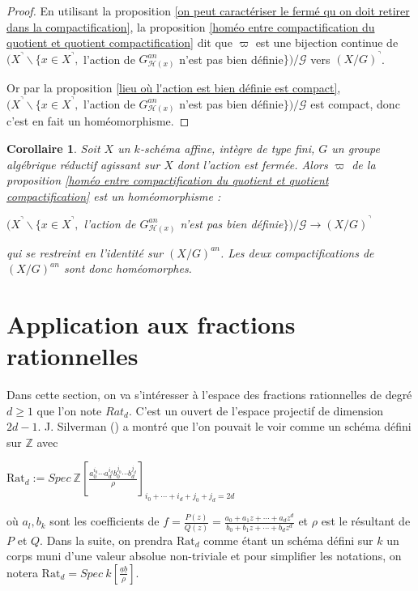 \documentclass[11pt]{article}
\newcommand{\Z}{\mathbb{Z}}
\newcommand{\Rat}{\mathrm{Rat}}
\newtheorem{cor}[thm]{Corollaire}
\begin{document}
\begin{proof}
En utilisant la proposition \ref{on peut caractériser le fermé qu on doit retirer dans la compactification}, la proposition \ref{homéo entre compactification du quotient et quotient compactification} dit que $\varpi$ est une bijection continue de $(X^\urcorner \backslash \lbrace x\in X^\urcorner,$ l'action de $G^{an}_{\mathcal{H}(x)}$ n'est pas bien définie$\rbrace)/\mathcal{G}$ vers $(X/G)^\urcorner$. 

Or par la proposition \ref{lieu où l'action est bien définie est compact}, $(X^\urcorner \backslash \lbrace x\in X^\urcorner,$ l'action de $G^{an}_{\mathcal{H}(x)}$ n'est pas bien définie$\rbrace)/\mathcal{G}$ est compact, donc c'est en fait un homéomorphisme.
\end{proof}

\begin{cor}
Soit $X$ un $k$-schéma affine, intègre de type fini, $G$ un groupe algébrique réductif agissant sur $X$ dont l'action est fermée. Alors $\varpi$ de la proposition \ref{homéo entre compactification du quotient et quotient compactification} est un homéomorphisme :
\begin{center}
$(X^\urcorner \backslash \lbrace x\in X^\urcorner,$ l'action de $G^{an}_{\mathcal{H}(x)}$ n'est pas bien définie$\rbrace)/\mathcal{G} \rightarrow (X/G)^\urcorner$
\end{center}
qui se restreint en l'identité sur $(X/G)^{an}$. Les deux compactifications de $(X/G)^{an}$ sont donc homéomorphes.
\end{cor} 

\section{Application aux fractions rationnelles}\label{ApplicationAuxFractionsRationnelles}

Dans cette section, on va s'intéresser à l'espace des fractions rationnelles de degré $d \geq 1$ que l'on note $Rat_d$. C'est un ouvert de l'espace projectif de dimension $2d-1$. J. Silverman (\cite{SilvermanSpaceRationalMaps}) a montré que l'on pouvait le voir comme un schéma défini sur $\Z$ avec 
\begin{center}
$\Rat_d := Spec~\Z[\frac{a_0^{i_0}\cdots a_d^{i_d}b_0^{j_0}\cdots b_d^{j_d}}{\rho}]_{i_0 + \cdots + i_d + j_0 + j_d = 2d}$
\end{center}  
où $a_l, b_k$ sont les coefficients de $f = \frac{P(z)}{Q(z)} = \frac{a_0 + a_1z + \cdots + a_dz^d}{b_0 + b_1z + \cdots + b_dz^d}$ et $\rho$ est le résultant de $P$ et $Q$. Dans la suite, on prendra $\Rat_d$ comme étant un schéma défini sur $k$ un corps muni d'une valeur absolue non-triviale et pour simplifier les notations, on notera $\Rat_d = Spec~k[\frac{\underline{a}\underline{b}}{\rho}]$.
\end{document}
